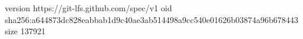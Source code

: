 version https://git-lfs.github.com/spec/v1
oid sha256:a644873dc828eabbab1d9c40ae3ab514498a9cc540e01626b03874a96b678443
size 137921
